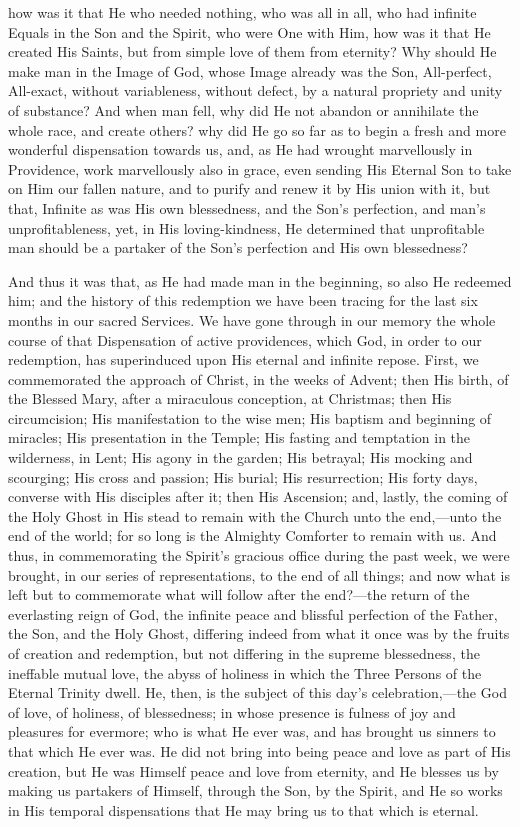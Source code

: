 how was it that He who needed nothing, who was all in all, who had
infinite Equals in the Son and the Spirit, who were One with Him, how
was it that He created His Saints, but from simple love of them from
eternity? Why should He make man in the Image of God, whose Image
already was the Son, All-perfect, All-exact, without variableness,
without defect, by a natural propriety and unity of substance? And
when man fell, why did He not abandon or annihilate the whole race,
and create others? why did He go so far as to begin a fresh and more
wonderful dispensation towards us, and, as He had wrought marvellously
in Providence, work marvellously also in grace, even sending His
Eternal Son to take on Him our fallen nature, and to purify and renew
it by His union with it, but that, Infinite as was His own
blessedness, and the Son's perfection, and man's unprofitableness,
yet, in His loving-kindness, He determined that unprofitable man
should be a partaker of the Son's perfection and His own blessedness?

And thus it was that, as He had made man in the beginning, so also
He redeemed him; and the history of this redemption we have been
tracing for the last six months in our sacred Services. We have gone
through in our memory the whole course of that Dispensation of active
providences, which God, in order to our redemption, has superinduced
upon His eternal and infinite repose. First, we commemorated the
approach of Christ, in the weeks of Advent; then His birth, of the
Blessed Mary, after a miraculous conception, at Christmas; then His
circumcision; His manifestation to the wise men; His baptism and
beginning of miracles; His presentation in the Temple; His fasting and
temptation in the wilderness, in Lent; His agony in the garden; His
betrayal; His mocking and scourging; His cross and passion; His
burial; His resurrection; His forty days, converse with His disciples
after it; then His Ascension; and, lastly, the coming of the Holy
Ghost in His stead to remain with the Church unto the end,—unto the
end of the world; for so long is the Almighty Comforter to remain with
us. And thus, in commemorating the Spirit's gracious office during the
past week, we were brought, in our series of representations, to the
end of all things; and now what is left but to commemorate what will
follow after the end?—the return of the everlasting reign of God,
the infinite peace and blissful perfection of the Father, the Son, and
the Holy Ghost, differing indeed from what it once was by the fruits
of creation and redemption, but not differing in the supreme
blessedness, the ineffable mutual love, the abyss of holiness in which
the Three Persons of the Eternal Trinity dwell. He, then, is the
subject of this day's celebration,—the God of love, of holiness, of
blessedness; in whose presence is fulness of joy and pleasures for
evermore; who is what He ever was, and has brought us sinners to that
which He ever was. He did not bring into being peace and love as part
of His creation, but He was Himself peace and love from eternity, and
He blesses us by making us partakers of Himself, through the Son, by
the Spirit, and He so works in His temporal dispensations that He may
bring us to that which is eternal.


